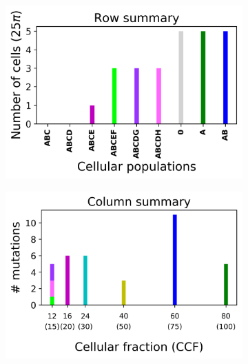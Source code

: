 \documentclass{article}
\begin{document}
\begin{figure}[h]
\begin{subfigure}[t]{0.58\linewidth}
		\caption{}
		\label{b}
	\end{subfigure}

	\par\bigskip

	\begin{subfigure}[t]{0.35\linewidth}
		\centering
		\includegraphics[width = 1.0\linewidth, trim={0 0 0 0}, clip=true]{rows.png}
		\caption{}
		\label{c}
	\end{subfigure}
	\hspace{0.1\linewidth}
	\begin{subfigure}[t]{0.35\linewidth}
		\centering
		\includegraphics[width = 1.0\linewidth, trim={0 0 0 0}, clip=true]{cols.png}
		\caption{}
		\label{d}
	\end{subfigure}


\end{figure}
\end{document}
